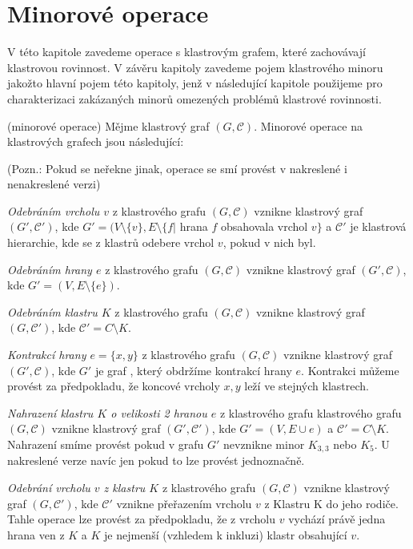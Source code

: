 \chapter{Minorové operace}

V této kapitole zavedeme operace s klastrovým grafem, které zachovávají klastrovou rovinnost. V závěru kapitoly zavedeme pojem klastrového minoru jakožto hlavní pojem této kapitoly, jenž v následující kapitole použijeme pro charakterizaci zakázaných minorů omezených problémů klastrové rovinnosti.

\begin{defn} (minorové operace) Mějme klastrový graf $(G, \mathcal C)$. Minorové operace na klastrových grafech jsou následující:

(Pozn.: Pokud se neřekne jinak, operace se smí provést v nakreslené i nenakreslené verzi)

\textit{Odebráním vrcholu $v$} z klastrového grafu $(G, \mathcal C)$ vznikne klastrový graf  $(G', \mathcal C')$, kde  $G' = (V \setminus \{v\}, E \setminus \{f |$ hrana $f$ obsahovala vrchol $v\}$ a $\mathcal C'$ je klastrová hierarchie, kde se z klastrů odebere vrchol $v$, pokud v nich byl.

\textit{Odebráním hrany $e$} z klastrového grafu $(G, \mathcal C)$ vznikne klastrový graf  $(G', \mathcal C)$, kde $G' =  (V,E \setminus \{e\})$.

\textit{Odebráním klastru $K$} z klastrového grafu $(G, \mathcal C)$ vznikne klastrový graf  $(G, \mathcal C')$, kde $\mathcal C' = C \setminus K$.

\textit{Kontrakcí hrany $e=\{x,y\}$} z klastrového grafu $(G, \mathcal C)$ vznikne klastrový graf  $(G', \mathcal C)$, kde $G'$ je graf , který obdržíme kontrakcí hrany $e$. Kontrakci můžeme provést za předpokladu, že koncové vrcholy $x, y$ leží ve stejných klastrech.

\textit{Nahrazení klastru $K$ o velikosti 2 hranou $e$} z klastrového grafu klastrového grafu $(G, \mathcal C)$ vznikne klastrový graf  $(G', \mathcal C')$, kde $G'=(V,E \cup e)$ a $\mathcal C'= C \setminus K$. Nahrazení smíme provést pokud v grafu $G'$ nevznikne minor $K_{3,3}$ nebo $K_5$. U nakreslené verze navíc jen pokud to lze provést jednoznačně.

\textit{Odebrání vrcholu $v$ z klastru $K$} z klastrového grafu $(G, \mathcal C)$ vznikne klastrový graf  $(G, \mathcal C')$, kde $\mathcal C'$ vznikne přeřazením vrcholu $v$ z Klastru K do jeho rodiče. Tahle operace lze provést za předpokladu, že z vrcholu $v$ vychází právě jedna hrana ven z $K$ a $K$ je nejmenší (vzhledem k inkluzi) klastr obsahující $v$.


\end{defn}
